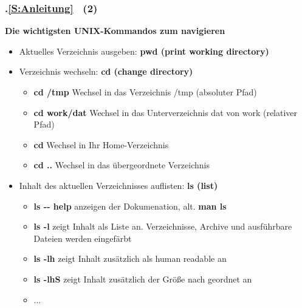 \begin{frame}[t]%
\frametitle{\kap.\ref{S:Anleitung} \stitle\ (2)}%
\medskip

\textbf{Die wichtigsten UNIX-Kommandos zum navigieren}
\begin{itemize}
  \setlength{\itemsep}{4pt}
  \item Aktuelles Verzeichnis ausgeben: \textbf{pwd (print working directory)}
  \item Verzeichnis wechseln: \textbf{cd (change directory)}
  \begin{itemize}
    \setlength{\itemsep}{2pt}
    \item \textbf{cd /tmp} Wechsel in das Verzeichnis /tmp (absoluter Pfad)
    \item \textbf{cd work/dat} Wechsel in das Unterverzeichnis dat von work (relativer Pfad)
    \item \textbf{cd} Wechsel in Ihr Home-Verzeichnis
    \item \textbf{cd ..} Wechsel in das \"ubergeordnete Verzeichnis
  \end{itemize}
  \item Inhalt des aktuellen Verzeichnisses auflisten: \textbf{ls (list)}
  \begin{itemize}
    \setlength{\itemsep}{2pt}
    \item \textbf{ls -{}- help} anzeigen der Dokumenation, alt. \textbf{man ls}
    \item \textbf{ls -l} zeigt Inhalt als Liste an. Verzeichnisse, Archive und ausf\"uhrbare Dateien werden eingef\"arbt
    \item \textbf{ls -lh} zeigt Inhalt zus\"atzlich als human readable an
    \item \textbf{ls -lhS} zeigt Inhalt zus\"atzlich der Gr\"o\ss e nach geordnet an
    \item $\ldots$
  \end{itemize}
\end{itemize}

\end{frame}


